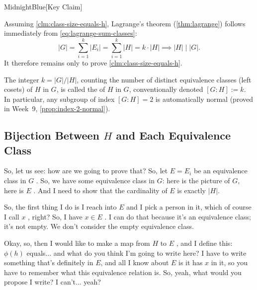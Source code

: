 \begin{proofWrapper}
\begin{content}
\begin{highlight}{MidnightBlue}[Key Claim]
\end{highlight}

Assuming \cref{clm:class-size-equals-h}, Lagrange's theorem (\cref{thm:lagrange}) follows immediately from \eqref{eq:lagrange-sum-classes}:
\[
|G| = \sum_{i=1}^k |E_i| = \sum_{i=1}^k |H| = k \cdot |H| \implies |H| \mid |G|.
\]
It therefore remains only to prove \cref{clm:class-size-equals-h}.
\end{content}

\begin{aiNote}
The integer $k = |G|/|H|$, counting the number of distinct equivalence classes (left cosets) of $H$ in $G$, is called the  of $H$ in $G$, conventionally denoted $[G : H] := k$. In particular, any subgroup of index $[G : H] = 2$ is automatically normal (proved in Week~9, \cref{prop:index-2-normal}).
\end{aiNote}

\subsection{Bijection Between \texorpdfstring{$H$}{H} and Each Equivalence Class}

\begin{speech}[00:22:30 - 00:23:52]
So, let us see: how are we going to prove that? So, let $E = E_i$ be an equivalence class in $G$ . So, we have some equivalence class in $G$: here is the picture of $G$, here is $E$ . And I need to show that the cardinality of $E$ is exactly $|H|$.

So, the first thing I do is I reach into $E$ and I pick a person in it, which of course I call $x$ , right? So, I have $x \in E$ . I can do that because it's an equivalence class; it's not empty. We don't consider the empty equivalence class.

Okay, so, then I would like to make a map from $H$ to $E$ , and I define this: $\phi(h)$ equals...  and what do you think I'm going to write here? I have to write something that's definitely in $E$, and all I know about $E$ is it has $x$ in it, so you have to remember what this equivalence relation is. So, yeah, what would you propose I write? I can't... yeah?
\end{speech}


\end{proofWrapper}
